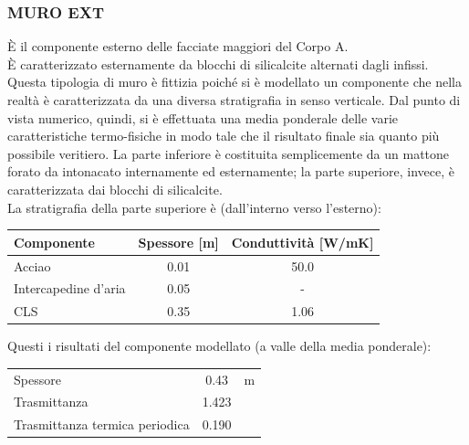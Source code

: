 \subsubsection{MURO EXT}
È il componente esterno delle facciate maggiori del Corpo A. \\È caratterizzato esternamente da blocchi di silicalcite alternati dagli infissi. \\Questa tipologia di muro è fittizia poiché si è modellato un componente che nella realtà è caratterizzata da una diversa stratigrafia in senso verticale. Dal punto di vista numerico, quindi, si è effettuata una media ponderale delle varie caratteristiche termo-fisiche in modo tale che il risultato finale sia quanto più possibile veritiero. La parte inferiore è costituita semplicemente da un mattone forato da  intonacato internamente ed esternamente; la parte superiore, invece, è caratterizzata dai blocchi di silicalcite. \\ La stratigrafia della parte superiore è (dall'interno verso l'esterno):
\begin{center}
	\begin{tabular}{lcc}
		\toprule
		Componente & Spessore [m] & Conduttività [\si{W/mK}] \\
		\midrule
		Acciao & \num{0.01} & \num{50.0} \\
		Intercapedine d'aria & \num{0.05} & -\\
		CLS & \num{0.35} & \num{1.06} \\
		\bottomrule
	\end{tabular}
\end{center}
Questi i risultati del componente modellato (a valle della media ponderale):
\begin{center}
	\begin{tabular}{lcc}
		\toprule
		Spessore & \num{0.43} & \si{m}\\
		Trasmittanza & \num{1.423} & \trasm\\
		Trasmittanza termica periodica & \num{0.190} & \trasm\\
		\bottomrule
	\end{tabular}
\end{center}
